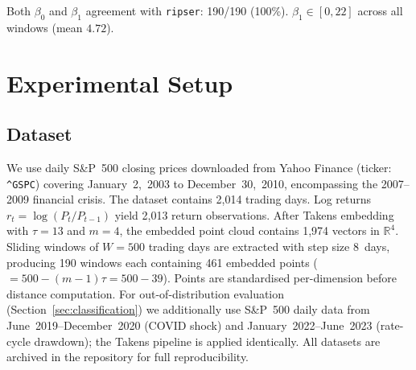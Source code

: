 \documentclass[conference,10pt]{IEEEtran}
\begin{document}
\begin{table}[t]
\caption{CE vs.\ \texttt{ripser} Agreement
         (2007--2009, $W=500$, $\varepsilon^*=0.32$)}
\label{tab:ce_validation}
\centering
{}
\par\smallskip
{\footnotesize Both $\beta_0$ and $\beta_1$ agreement with
\texttt{ripser}: 190/190 (100\%). $\beta_1 \in [0, 22]$ across all
windows (mean $4.72$).}
\end{table}

\section{Experimental Setup}\label{sec:setup}

\subsection{Dataset}

We use daily S\&P~500 closing prices downloaded from Yahoo Finance
(ticker: \texttt{\^{}GSPC}) covering January~2,~2003 to
December~30,~2010, encompassing the 2007--2009 financial crisis. The
dataset contains 2,014 trading days. Log returns
$r_t = \log(P_t/P_{t-1})$ yield 2,013 return observations. After
Takens embedding with $\tau=13$ and $m=4$, the embedded point cloud
contains 1,974 vectors in $\mathbb{R}^4$. Sliding windows of $W=500$
trading days are extracted with step size 8~days, producing 190
windows each containing 461 embedded points ($= 500 - (m-1)\tau = 500 -
39$). Points are standardised per-dimension before distance
computation. For out-of-distribution evaluation
(Section~\ref{sec:classification}) we additionally use S\&P~500 daily
data from June~2019--December~2020 (COVID shock) and
January~2022--June~2023 (rate-cycle drawdown); the Takens pipeline is
applied identically. All datasets are archived in the repository for
full reproducibility.
\end{document}
